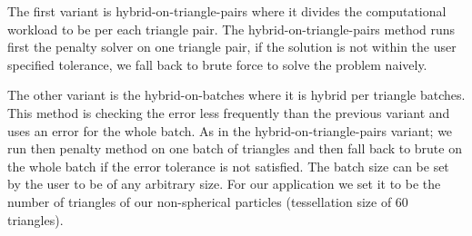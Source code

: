 The first variant is hybrid-on-triangle-pairs where it divides the computational workload to be per each triangle pair. The hybrid-on-triangle-pairs method runs first the penalty solver on one triangle pair, if the solution is not within the user specified tolerance, we fall back to brute force to solve the problem naively. 

 \begin{algorithmic}[1]

	
	
			


	
				\EndIf
	
			\EndFor
			
		\EndFor
		
	
	\EndFunction
	
 \label{algorithm:hybridTriangle}
 \end{algorithmic}

The other variant is the hybrid-on-batches where it is hybrid per triangle batches. This method is checking the error less frequently than the previous variant and uses an error for the whole batch. As in the hybrid-on-triangle-pairs variant; we run then penalty method on one batch of triangles and then fall back to brute on the whole batch if the error tolerance is not satisfied. The batch size can be set by the user to be of any arbitrary size. For our application we set it to be the number of triangles of our non-spherical particles (tessellation size of 60~ triangles).    

